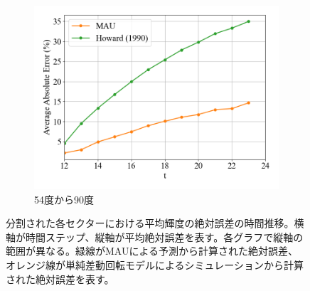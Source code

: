 \begin{figure}[htbp]
              \begin{subfigure}{0.5\textwidth}
                \centering
                \includegraphics[width=\textwidth]{figures/exp2/lng_error_5.png}
                \caption{54度から90度}
              \end{subfigure}
              \caption{分割された各セクターにおける平均輝度の絶対誤差の時間推移。横軸が時間ステップ、縦軸が平均絶対誤差を表す。各グラフで縦軸の範囲が異なる。緑線がMAUによる予測から計算された絶対誤差、オレンジ線が単純差動回転モデルによるシミュレーションから計算された絶対誤差を表す。}
              \label{fig:exp2_lng_error}
            \end{figure}
          
